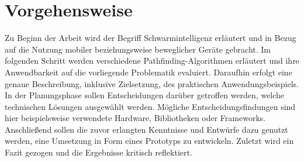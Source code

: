 \section{Vorgehensweise}
Zu Beginn der Arbeit wird der Begriff Schwarmintelligenz erläutert und in Bezug auf die Nutzung mobiler beziehungsweise beweglicher Geräte gebracht. Im folgenden Schritt werden verschiedene Pathfinding-Algorithmen erläutert und ihre Anwendbarkeit auf die vorliegende Problematik evaluiert. Daraufhin erfolgt eine genaue Beschreibung, inklusive Zielsetzung, des praktischen Anwendungsbeispiels.   
In der Planungsphase sollen Entscheidungen darüber getroffen werden, welche technischen Lösungen ausgewählt werden. Mögliche Entscheidungsfindungen sind hier beispielsweise verwendete Hardware, Bibliotheken oder Frameworks. Anschließend sollen die zuvor erlangten Kenntnisse und Entwürfe dazu genutzt werden, eine Umsetzung in Form eines Prototyps zu entwickeln. Zuletzt wird ein Fazit gezogen und die Ergebnisse kritisch reflektiert.

